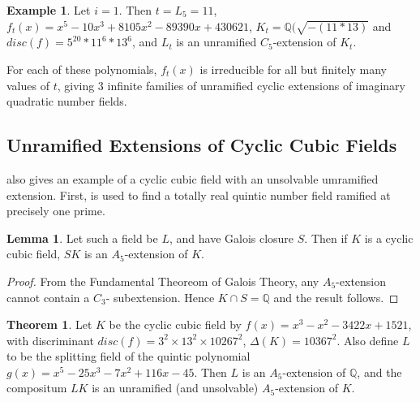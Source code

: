 \documentclass[12pt]{extarticle}
\newcommand{\Q}{\mathbb{Q}}
\newcommand{\<}{\langle}
\renewcommand{\>}{\rangle}
\theoremstyle{definition}
\newtheorem{theorem}{Theorem}
\newtheorem*{example}{Example}
\newtheorem{lemma}{Lemma}
\begin{document}
\begin{example}
Let $i=1$. Then $t=L_{5} = 11$, $f_t(x) = x^5 - 10x^3 + 8105x^2 - 89390x + 430621$, $K_t = \Q(\sqrt{-( 11*13)}$ and $disc(f) =5^{20} * 11^6 * 13^6
$,  and $L_t$ is an unramified $C_5$-extension of $K_t$. 
\end{example}
For each of these polynomials, $f_t(x)$ is irreducible for all but finitely many values of $t$, giving 3 infinite families of unramified cyclic extensions of imaginary quadratic number fields. 


\subsection{Unramified Extensions of Cyclic Cubic Fields}
\cite{WONG} also gives an example of a cyclic cubic field with an unsolvable umramified extension.
First, \cite{JONE2} is used to find a totally real quintic number field ramified at precisely one prime.

\begin{lemma}
 Let such a field be $L$, and have Galois closure $S$. Then if $K$ is a cyclic cubic field, $SK$ is an $A_5$-extension of $K$.
\end{lemma}
\begin{proof}
From the Fundamental Theoreom of Galois Theory, any $A_5$-extension cannot contain a $C_3$- subextension. Hence $K \cap S = \Q$ and the result follows.
\end{proof}
\begin{theorem}
Let $K$ be the cyclic cubic field by $f(x) = x^3 - x^2 - 3422x + 1521$, with discriminant $disc(f) = 3^2 \times 13^2 \times 10267^2$, $\Delta(K) = 10367^2$. Also define $L$ to be the splitting field of the quintic polynomial $g(x) = x^5 - 25x^3 - 7x^2 + 116x - 45$. Then $L$ is an $A_5$-extension of $\Q$, and the compositum $LK$ is an unramified (and unsolvable) $A_5$-extension of $K$.
\end{theorem}
\end{document}
